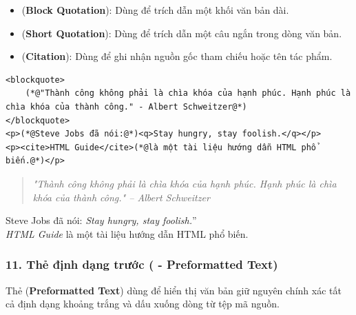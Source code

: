 \begin{itemize}[leftmargin=1.8em, itemsep=3pt, parsep=0pt]
    \item {} (\textbf{Block Quotation}): Dùng để trích dẫn một khối văn bản dài.
    \item {} (\textbf{Short Quotation}): Dùng để trích dẫn một câu ngắn trong dòng văn bản.
    \item {} (\textbf{Citation}): Dùng để ghi nhận nguồn gốc tham chiếu hoặc tên tác phẩm.
\end{itemize}

\begin{codeWindow}
\begin{lstlisting}[language=HTML5]
<blockquote>
    (*@"Thành công không phải là chìa khóa của hạnh phúc. Hạnh phúc là chìa khóa của thành công." - Albert Schweitzer@*)
</blockquote>
<p>(*@Steve Jobs đã nói:@*)<q>Stay hungry, stay foolish.</q></p>
<p><cite>HTML Guide</cite>(*@là một tài liệu hướng dẫn HTML phổ biến.@*)</p>
\end{lstlisting}
\end{codeWindow}

\begin{tcolorbox}[
    enhanced,
    colback=white,
    colframe=primaryBlue!20,
    arc=6pt,
    boxrule=0.8pt,
    drop shadow=black!3!white,
    top=8pt, bottom=8pt, left=12pt, right=12pt,
    title={\sffamily\bfseries\scriptsize\color{codeComment} KẾT QUẢ HIỂN THỊ TRÊN TRÌNH DUYỆT (BROWSER PREVIEW)},
    coltitle=codeComment,
    colbacktitle=codeBg!80!white
]
\begin{quote}
\itshape "Thành công không phải là chìa khóa của hạnh phúc. Hạnh phúc là chìa khóa của thành công." -- Albert Schweitzer
\end{quote}
Steve Jobs đã nói: \codeinline{}\textit{Stay hungry, stay foolish.}''\\[3pt]
\textit{HTML Guide} là một tài liệu hướng dẫn HTML phổ biến.
\end{tcolorbox}


\subsubsection{11. Thẻ định dạng trước ( - Preformatted Text)}

Thẻ  (\textbf{Preformatted Text}) dùng để hiển thị văn bản giữ nguyên chính xác tất cả định dạng khoảng trắng và dấu xuống dòng từ tệp mã nguồn.

